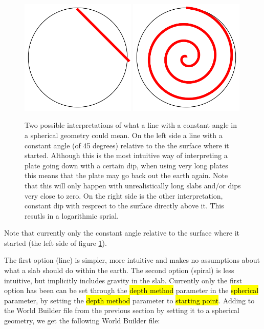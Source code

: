 \documentclass{book}
\newcommand{\WB}{{World Builder}}
\begin{document}
\begin{figure}
    \centering
    \includegraphics[width=0.49\textwidth]{spherical_approximations_line}
    \includegraphics[width=0.49\textwidth]{spherical_approximations_spiral}
    \caption{Two possible interpretations of what a line with a constant angle in a spherical geometry could mean. On the left side a line with a constant angle (of 45 degrees) relative to the the surface where it started. Although this is the most intuitive way of interpreting a plate going down with a certain dip, when using very long plates this means that the plate may go back out the earth again. Note that this will only happen with unrealistically long slabs and/or dips very close to zero. On the right side is the other interpretation, constant dip with resprect to the surface directly above it. This resutls in a logarithmic sprial.}
    \label{fig:coordinate_systems_line_spiral}
\end{figure}

\begin{remark}
Note that currently only the constant angle relative to the surface where it started (the left side of figure \ref{fig:coordinate_systems_line_spiral}).
\end{remark}

The first option (line) is simpler, more intuitive and makes no assumptions about what a slab should do within the earth. The second option (spiral) is less intuitive, but implicitly includes gravity in the slab. Currently only the first option has been can be set through the \hl{depth method} parameter in the \hl{spherical} parameter, by setting the \hl{depth method} parameter to \hl{starting point}. Adding to the \WB{} file from the previous section by setting it to a spherical geometry, we get the following \WB{} file:
\end{document}
